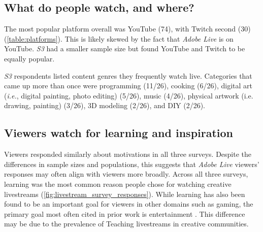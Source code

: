 \subsection{What do people watch, and where?}
The most popular platform overall was YouTube (74), with Twitch second (30) (\autoref{table:platforms}). This is likely skewed by the fact that \textit{Adobe Live} is on YouTube. \textit{S3} had a smaller sample size but found YouTube and Twitch to be equally popular.

\textit{S3} respondents listed content genres they frequently watch live. Categories that came up more than once were programming (11/26), cooking (6/26), digital art (\emph{i.e.}, digital painting, photo editing) (5/26), music (4/26), physical artwork (i.e. drawing, painting) (3/26), 3D modeling (2/26), and DIY (2/26).

\subsection{Viewers watch for learning and inspiration}
Viewers responded similarly about motivations in all three surveys. Despite the differences in sample sizes and populations, this suggests that \textit{Adobe Live} viewers' responses may often align with viewers more broadly. Across all three surveys, learning was the most common reason people chose for watching creative livestreams (\autoref{fig:livestream_survey_responses}). While learning has also been found to be an important goal for viewers in other domains such as gaming, the primary goal most often cited in prior work is entertainment \cite{Lu2019, Wohn2018, Lu2018a, Hilvert-Bruce2018, Faas2018, Cheung2011}.
This difference may be due to the prevalence of Teaching livestreams in creative communities.

